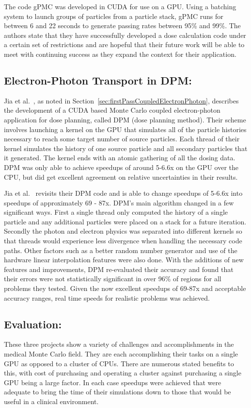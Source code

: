 %
The code gPMC was developed in CUDA for use on a GPU.
%
Using a batching system to launch groups of particles from a particle stack,
gPMC runs for between 6 and 22 seconds to generate passing rates between 95\% and 99\%.
%
The authors state that they have successfully developed a dose calculation code under a certain set of restrictions and are hopeful that their future work will be able to meet with continuing success as they expand the context for their application.~\cite{jia2012gpu}

\subsection*{\textbf{Electron-Photon Transport in DPM}:}

Jia et al.~\cite{jia2010development}, as noted in Section~\ref{sec:firstPassCoupledElectronPhoton}, describes the development of a CUDA based Monte Carlo coupled electron-photon application for dose planning, called DPM (dose planning method).
%
 Their scheme involves launching a kernel on the GPU that simulates all of the particle histories necessary to reach some target number of source particles.
 Each thread of their kernel simulates the history of one source particle and all secondary particles that it generated.
 The kernel ends with an atomic gathering of all the dosing data.
 DPM was only able to achieve speedups of around 5-6.6x on the GPU over the CPU, but did get excellent agreement on relative uncertainties in their results.
 
 Jia et al.~\cite{jia2011gpu} revisits their DPM code and is able to change speedups of 5-6.6x into speedups of approximately 69 - 87x.
%
DPM's main algorithm changed in a few significant ways.
%
First a single thread only computed the history of a single particle and any additional particles were placed on a stack for a future iteration.
%
Secondly the photon and electron physics was separated into different kernels so that threads would experience less divergence when handling the necessary code paths.
%
Other factors such as a better random number generator and use of the hardware linear interpolation features were also done.
%
With the additions of new features and improvements, DPM re-evaluated their accuracy and found that their errors were not statistically significant in over 96\% of regions for all problems they tested.
%
Given the now excellent speedups of 69-87x and acceptable accuracy ranges, real time speeds for realistic problems was achieved.
~\cite{jia2011gpu}


\subsection*{\textbf{Evaluation}:}

These three projects show a variety of challenges and accomplishments in the medical Monte Carlo field.
%
They are each accomplishing their tasks on a single GPU as opposed to a cluster of CPUs.
%
There are numerous stated benefits to this, with cost of purchasing and operating a cluster against purchasing a single GPU being a large factor.
%
In each case speedups were achieved that were adequate to bring the time of their simulations down to those that would be useful in a clinical environment.
%
